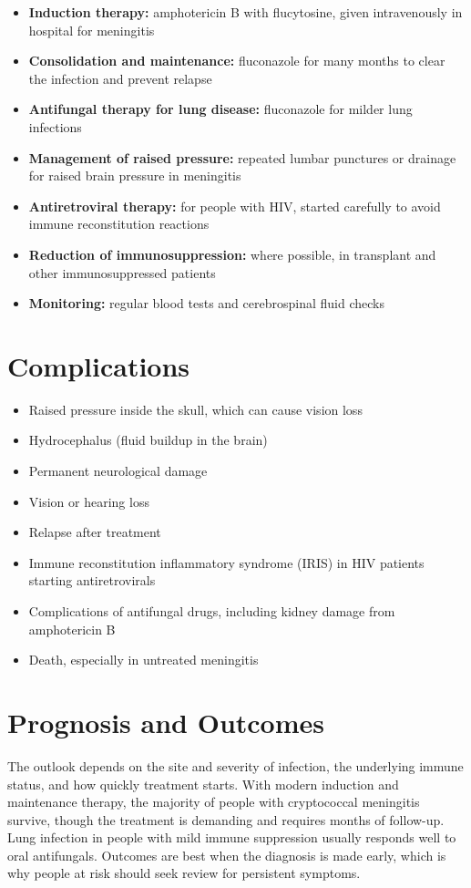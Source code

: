 \begin{itemize}
    \item \textbf{Induction therapy:} amphotericin B with flucytosine, given intravenously in hospital for meningitis
    \item \textbf{Consolidation and maintenance:} fluconazole for many months to clear the infection and prevent relapse
    \item \textbf{Antifungal therapy for lung disease:} fluconazole for milder lung infections
    \item \textbf{Management of raised pressure:} repeated lumbar punctures or drainage for raised brain pressure in meningitis
    \item \textbf{Antiretroviral therapy:} for people with HIV, started carefully to avoid immune reconstitution reactions
    \item \textbf{Reduction of immunosuppression:} where possible, in transplant and other immunosuppressed patients
    \item \textbf{Monitoring:} regular blood tests and cerebrospinal fluid checks
\end{itemize}

\section*{Complications}
\begin{itemize}
    \item Raised pressure inside the skull, which can cause vision loss
    \item Hydrocephalus (fluid buildup in the brain)
    \item Permanent neurological damage
    \item Vision or hearing loss
    \item Relapse after treatment
    \item Immune reconstitution inflammatory syndrome (IRIS) in HIV patients starting antiretrovirals
    \item Complications of antifungal drugs, including kidney damage from amphotericin B
    \item Death, especially in untreated meningitis
\end{itemize}

\section*{Prognosis and Outcomes}
The outlook depends on the site and severity of infection, the underlying immune status, and how quickly treatment starts. With modern induction and maintenance therapy, the majority of people with cryptococcal meningitis survive, though the treatment is demanding and requires months of follow-up. Lung infection in people with mild immune suppression usually responds well to oral antifungals. Outcomes are best when the diagnosis is made early, which is why people at risk should seek review for persistent symptoms.

